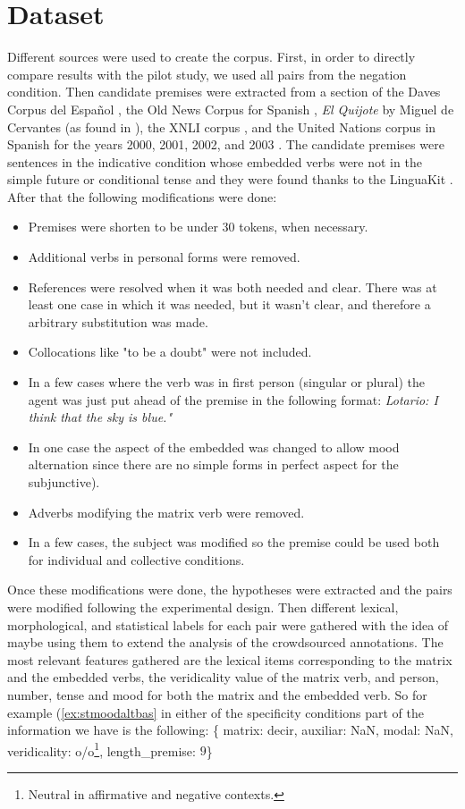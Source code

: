 \section{Dataset}
Different sources were used to create the corpus. First, in order to directly compare results with the pilot study, we used all pairs from the negation condition. Then candidate premises were extracted from a section of the Daves Corpus del Español \citep{daves2016}, the Old News Corpus for Spanish \citep{oldnews}, \textit{El Quijote} by Miguel de Cervantes (as found in \citet{jsdario2017}), the XNLI corpus \citep{conneau2018xnli}, and the United Nations corpus in Spanish for the years 2000, 2001, 2002, and 2003 \citep{eisele2010multiun}. The candidate premises were sentences in the indicative condition whose embedded verbs were not in the simple future or conditional tense and they were found thanks to the LinguaKit \citep{Gamallo95}. After that the following modifications were done:\\
    \begin{itemize}
    \item Premises were shorten to be under 30 tokens, when necessary.
    \item Additional verbs in personal forms were removed.
    \item References were resolved when it was both needed and clear. There was at least one case in which it was needed, but it wasn't clear, and therefore a arbitrary substitution was made.
    \item Collocations like "to be a doubt" were not included.
    \item In a few cases where the verb was in first person (singular or plural) the agent was just put ahead of the premise in the following format: \textit{Lotario: I think that the sky is blue."}
    \item In one case the aspect of the embedded was changed to allow mood alternation since there are no simple forms in perfect aspect for the subjunctive).
    \item Adverbs modifying the matrix verb were removed.
    \item In a few cases, the subject was modified so the premise could be used both for individual and collective conditions.
  \end{itemize}

Once these modifications were done, the hypotheses were extracted and the pairs were modified following the experimental design. Then different lexical, morphological, and statistical labels for each pair were gathered with the idea of maybe using them to extend the analysis of the crowdsourced annotations. The most relevant features gathered are the lexical items corresponding to the matrix and the embedded verbs, the veridicality value of the matrix verb, and person, number, tense and mood for both the matrix and the embedded verb. So for example (\ref{ex:stmoodaltbas} in either of the specificity conditions part of the information we have is the following: \{ matrix: decir, auxiliar: NaN, modal: NaN, veridicality: o/o\footnote{Neutral in affirmative and negative contexts.}, length\_premise: $9$\}\\

